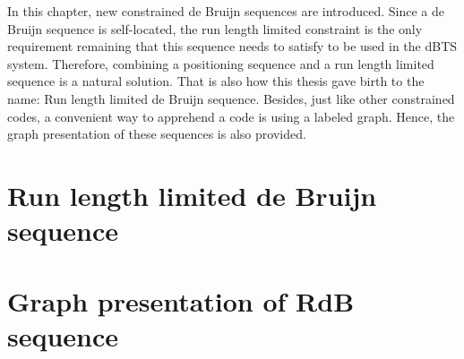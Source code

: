 In this chapter, new constrained de Bruijn sequences are introduced. Since a de Bruijn sequence is self-located, the run length limited constraint is the only requirement remaining that this sequence needs to satisfy to be used in the \gls{dBTS} system. Therefore, combining a positioning sequence and a run length limited sequence is a natural solution. That is also how this thesis gave birth to the name: Run length limited de Bruijn sequence. Besides, just like other constrained codes, a convenient way to apprehend a code is using a labeled graph. Hence, the graph presentation of these sequences is also provided. 

\section{Run length limited de Bruijn sequence}



\section{Graph presentation of RdB sequence}









